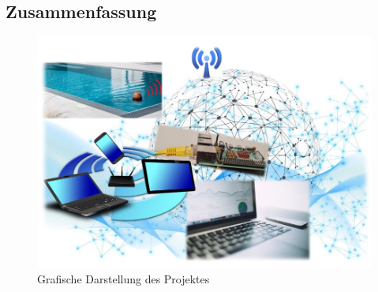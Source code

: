\begin{spacing}{1}
    \chapter*{Zusammenfassung}
\end{spacing}
\begin{figure}
    \begin{center}
     
    \end{center}
\end{figure}

\begin{figure}[H]
  \centering
  \includegraphics[width=1\textwidth]{pics/ProjectOverview.jpg}
  \caption{Grafische Darstellung des Projektes}
\end{figure}